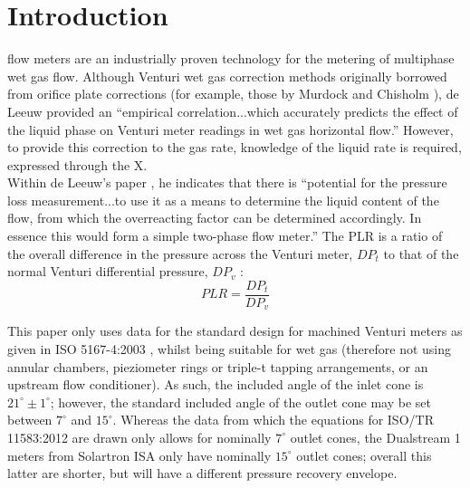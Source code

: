 \documentclass[journal]{IEEEtran}
\begin{document}






%



\section{Introduction}
 flow meters are an industrially proven technology for the metering of multiphase wet gas flow. Although Venturi wet gas correction methods originally borrowed from orifice plate corrections (for example, those by Murdock \cite{Murdock1962} and Chisholm \cite{Chisholm1977}), de Leeuw \cite{DeLeeuw1997} provided an ``empirical correlation...which accurately predicts the effect of the liquid phase on Venturi meter readings in wet gas horizontal flow.''  However, to provide this correction to the gas rate, knowledge of the liquid rate is required, expressed through the \acrfull{X}.\\

Within de Leeuw's paper \cite{DeLeeuw1997}, he indicates that there is ``potential for the pressure loss measurement...to use it as a means to determine the liquid content of the flow, from which the overreacting factor can be determined accordingly. In essence this would form a simple two-phase flow meter.''  The \acrlong{PLR} is a ratio of the overall difference in the pressure across the Venturi meter, $DP_{t}$ to that of the normal Venturi differential pressure, $DP_{v}$ :
\begin{equation}
    PLR = \frac{DP_{t}}{DP_{v}}
\end{equation}


This paper only uses data for the standard design for machined Venturi meters as given in ISO 5167-4:2003 \cite{2003ISOTubes}, whilst being suitable for wet gas (therefore not using annular chambers, pieziometer rings or triple-t tapping arrangements, or an upstream flow conditioner).  As such, the included angle of the inlet cone is $21^{\circ} \pm 1^{\circ}$; however, the standard included angle of the outlet cone may be set between $7^{\circ}$ and $15^{\circ}$.  Whereas the data from which the equations for ISO/TR 11583:2012 are drawn only allows for nominally $7^{\circ}$ outlet cones, the Dualstream 1 meters from Solartron ISA only have nominally $15^{\circ}$ outlet cones; overall this latter are shorter, but will have a different pressure recovery envelope.
\end{document}
